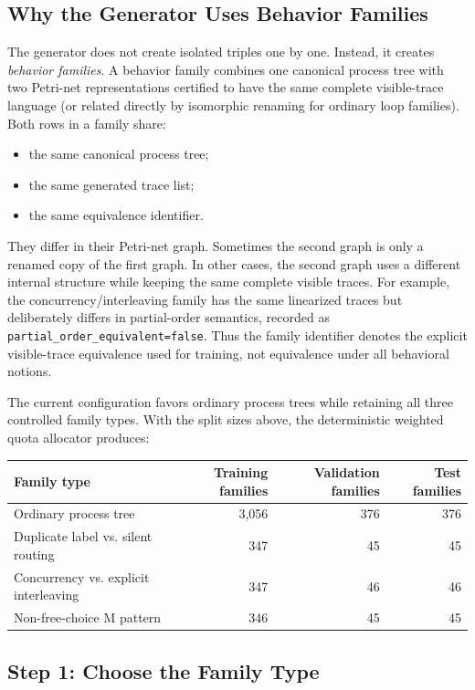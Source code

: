 \documentclass[manuscript,screen,nonacm]{acmart}
\begin{document}
\subsection{Why the Generator Uses Behavior Families}
\label{app:behavior-families}

The generator does not create isolated triples one by one. Instead, it creates
\emph{behavior families}. A behavior family combines one canonical process tree with
two Petri-net representations certified to have the same complete visible-trace
language (or related directly by isomorphic renaming for ordinary loop
families). Both rows in a family share:
\begin{itemize}
  \item the same canonical process tree;
  \item the same generated trace list;
  \item the same equivalence identifier.
\end{itemize}
They differ in their Petri-net graph. Sometimes the second graph is only a
renamed copy of the first graph. In other cases, the second graph uses a
different internal structure while keeping the same complete visible traces.
For example, the concurrency/interleaving family has the same linearized traces
but deliberately differs in partial-order semantics, recorded as
\texttt{partial\_order\_equivalent=false}. Thus the family identifier denotes
the explicit visible-trace equivalence used for training, not equivalence under
all behavioral notions.

The current configuration favors ordinary process trees while retaining all
three controlled family types. With the split sizes above, the deterministic
weighted quota allocator produces:
\begin{center}
\small
\begin{tabular}{lrrr}
\toprule
Family type & Training families & Validation families & Test families \\
\midrule
Ordinary process tree & 3{,}056 & 376 & 376 \\
Duplicate label vs. silent routing & 347 & 45 & 45 \\
Concurrency vs. explicit interleaving & 347 & 46 & 46 \\
Non-free-choice M pattern & 346 & 45 & 45 \\
\bottomrule
\end{tabular}
\end{center}

\subsection{Step 1: Choose the Family Type}
\label{app:choose-family-type}
\end{document}
